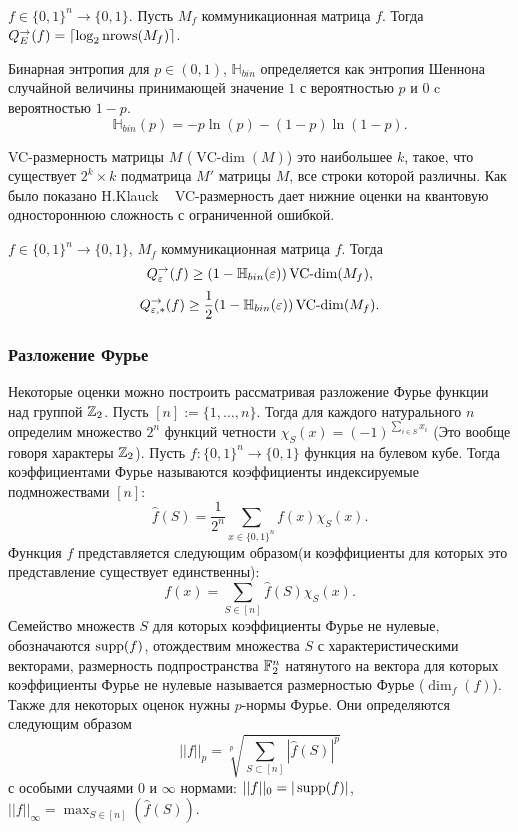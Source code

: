 \documentclass{article}
\begin{document}
~\cite{klauck}
\begin{theorem}
    \label{th:klauckexact}
    $f \in \{0, 1\}^n \to \{0, 1\}$. Пусть $M_f$ коммуникационная матрица $f$. 
    Тогда $Q_{E}^{\to}(f) = \lceil\log_2{\operatorname{nrows}(M_f)}\rceil$.
\end{theorem}
\begin{definition}Бинарная энтропия для $p \in (0, 1)$, $\mathbb{H}_{bin}$ определяется как энтропия Шеннона случайной величины принимающей значение $1$ с вероятностью $p$ и $0$ c вероятностью $1 - p$. 
$$\mathbb{H}_{bin}(p) = -p\ln(p) - (1 - p)\ln(1 - p).$$
\end{definition}
\begin{definition}
VC-размерность матрицы $M$ ($\operatorname{VC-dim}(M)$) это наибольшее $k$, такое, что существует $2^k \times k$ подматрица $M'$ матрицы $M$, все строки которой различны. Как было показано H.Klauck ~\cite{klauck} VC-размерность дает нижние оценки на квантовую одностороннюю сложность с ограниченной ошибкой.
\end{definition}
\begin{theorem}
    \label{th:klauckbounded}
    $f \in \{0, 1\}^n \to \{0, 1\}$, $M_f$ коммуникационная матрица $f$. 
    Тогда $$Q_{\varepsilon}^{\to}(f) \geq (1 - \mathbb{H}_{bin}(\varepsilon))\operatorname{VC-dim}(M_f),$$ $$Q_{\varepsilon, *}^{\to}(f) \geq \frac{1}{2}(1 - \mathbb{H}_{bin}(\varepsilon))\operatorname{VC-dim}(M_f).$$
\end{theorem} 

\subsubsection{Разложение Фурье}
Некоторые оценки можно построить рассматривая разложение Фурье функции над группой $\mathbb{Z}_2$. Пусть $[n] := \{1, \ldots, n\}$. Тогда для каждого натурального $n$ определим множество $2^n$ функций четности $\chi_S(x) = (-1)^{\sum_{i \in S}x_i}$ (Это вообще говоря характеры $\mathbb{Z}_2$). Пусть $f : \{0, 1\}^n \to \{0, 1\}$ функция на булевом кубе. Тогда коэффициентами Фурье  называются коэффициенты индексируемые подмножествами $[n]$:
$$\hat f(S) = \frac{1}{2^n}\sum_{x \in \{0, 1\}^n}f(x)\chi_S(x).$$
Функция $f$ представляется следующим образом(и коэффициенты для которых это представление существует единственны):
$$f(x) = \sum_{S \in [n]}\hat f(S)\chi_S(x).$$
Семейство множеств $S$ для которых коэффициенты Фурье не нулевые, обозначаются $\operatorname{supp}(f)$, отождествим множества $S$ с характеристическими векторами, размерность подпространства $\mathbb{F}_2^n$ натянутого на вектора для которых коэффициенты Фурье не нулевые называется размерностью Фурье ($\dim_f(f)$). Также для некоторых оценок нужны $p$-нормы Фурье. Они определяются следующим образом $$||f||_p = \sqrt[p]{\sum_{S \subset [n]}|\hat f(S)|^{p}}$$
с особыми случаями $0$ и $\infty$ нормами: $||f||_0 = |\operatorname{supp}(f)|$, $||f||_{\infty} = \max_{S \in [n]}(\hat f(S)).$   
\end{document}
